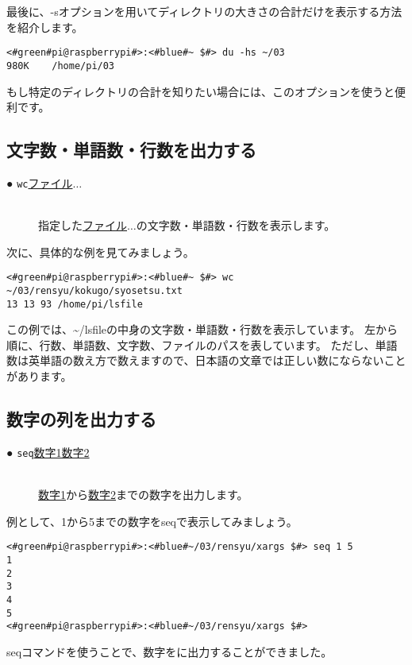 最後に、-sオプションを用いてディレクトリの大きさの合計だけを表示する方法を紹介します。
\begin{lstlisting}[caption=du -hsの実行例, label=du_example]
<#green#pi@raspberrypi#>:<#blue#~ $#> du -hs ~/03
980K	/home/pi/03
\end{lstlisting}
もし特定のディレクトリの合計を知りたい場合には、このオプションを使うと便利です。

\subsection{文字数・単語数・行数を出力する}
\begin{description}
    \item[● \texttt{wc}\textvisiblespace \underline{ファイル}$\ldots$]\mbox{}\\
    指定した\underline{ファイル}$\ldots$の文字数・単語数・行数を表示します。
\end{description}
次に、具体的な例を見てみましょう。
\begin{lstlisting}[caption=wcコマンドの実行例, label=wc_example]
<#green#pi@raspberrypi#>:<#blue#~ $#> wc ~/03/rensyu/kokugo/syosetsu.txt
13 13 93 /home/pi/lsfile
\end{lstlisting}
この例では、\textasciitilde/lsfileの中身の文字数・単語数・行数を表示しています。
左から順に、行数、単語数、文字数、ファイルのパスを表しています。
ただし、単語数は英単語の数え方で数えますので、日本語の文章では正しい数にならないことがあります。

\subsection{数字の列を出力する}
\begin{description}
    \item[● \texttt{seq}\textvisiblespace \underline{数字1}\textvisiblespace \underline{数字2}]\mbox{}\\
    \underline{数字1}から\underline{数字2}までの数字を出力します。
\end{description}
例として、1から5までの数字をseqで表示してみましょう。
\begin{lstlisting}[caption=seqコマンド]
<#green#pi@raspberrypi#>:<#blue#~/03/rensyu/xargs $#> seq 1 5
1
2
3
4
5
<#green#pi@raspberrypi#>:<#blue#~/03/rensyu/xargs $#>
\end{lstlisting}
seqコマンドを使うことで、数字をに出力することができました。

